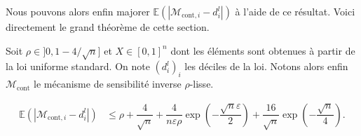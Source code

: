 Nous pouvons alors enfin majorer \(\mathbb E (|\mathcal M_{\text{cont}, i} - d_i^l|)\) à l'aide de ce résultat. Voici directement le grand théorème de cette section.

\begin{theorem}
    Soit \(\rho \in ]0, 1 - 4/\sqrt n]\) et \(X \in [0,1]^n\) dont les éléments sont obtenues à partir de la loi uniforme standard. On note \((d_i^l)_i\) les déciles de la loi. Notons alors enfin \(\mathcal M_{\text{cont}}\) le mécanisme de sensibilité inverse \(\rho\)-lisse.

    \begin{align*}
        \mathbb E(|\mathcal M_{\text{cont}, i} - d_i^l|) & \leq \rho + \dfrac{4}{\sqrt n} +\dfrac{4}{n\varepsilon\rho}\exp\left( -\dfrac{\sqrt n \varepsilon}{2} \right) + \dfrac{16}{\sqrt{n}}\exp\left( -\dfrac{\sqrt n }{4} \right).
    \end{align*}
\end{theorem}

